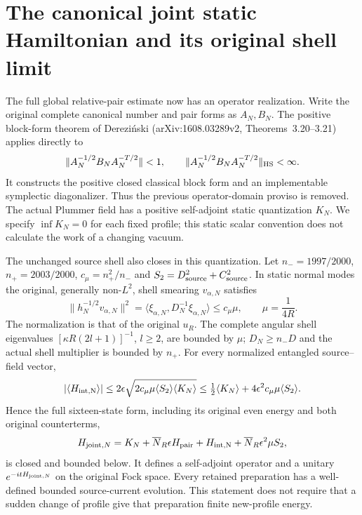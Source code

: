 \section{The canonical joint static Hamiltonian and its original shell limit}
The full global relative-pair estimate now has an operator realization.
Write the original complete canonical number and pair forms as $A_N,B_N$.
The positive block-form theorem of Derezi\'nski
(arXiv:1608.03289v2, Theorems~3.20--3.21) applies directly to
\[
 \|A_N^{-1/2}B_NA_N^{-T/2}\|<1,\qquad
 \|A_N^{-1/2}B_NA_N^{-T/2}\|_{\rm HS}<\infty.
\]
It constructs the positive closed classical block form and an implementable
symplectic diagonalizer. Thus the previous operator-domain proviso is
removed. The actual Plummer field has a positive self-adjoint static
quantization $K_N$. We specify $\inf K_N=0$ for each fixed profile; this
static scalar convention does not calculate the work of a changing vacuum.

The unchanged source shell also closes in this quantization. Let
$n_-=1997/2000$, $n_+=2003/2000$, $c_\mu=n_+^2/n_-$ and
$S_2=D_{\rm source}^2+C_{\rm source}^2$. In static normal modes the
original, generally non-$L^2$, shell smearing $v_{\alpha,N}$ satisfies
\[
 \|h_N^{-1/2}v_{\alpha,N}\|^2
 =\langle\xi_{\alpha,N},D_N^{-1}\xi_{\alpha,N}\rangle
 \le c_\mu\mu,\qquad \mu=\frac1{4R}.
\]
The normalization is that of the original $u_R$.
The complete angular shell eigenvalues
$[\kappa R(2l+1)]^{-1}$, $l\ge2$, are bounded by $\mu$;
$D_N\ge n_-D$ and the actual shell multiplier is bounded by $n_+$.
For every normalized entangled source--field vector,
\[
 |\langle H_{\rm int,N}\rangle|
 \le2\epsilon\sqrt{2c_\mu\mu\langle S_2\rangle
                                      \langle K_N\rangle}
 \le\tfrac12\langle K_N\rangle
                          +4\epsilon^2c_\mu\mu\langle S_2\rangle.
\]
Hence the full sixteen-state form, including its original even energy
and both original counterterms,
\[
 H_{{\rm joint},N}=K_N+\overline N_R\epsilon H_{\rm pair}
      +H_{\rm int,N}+\overline N_R\epsilon^2\mu S_2,
\]
is closed and bounded below. It defines a self-adjoint operator and a
unitary $e^{-itH_{{\rm joint},N}}$ on the original Fock space. Every
retained preparation has a well-defined bounded source-current evolution.
This statement does not require that a sudden change of profile give that
preparation finite new-profile energy.

